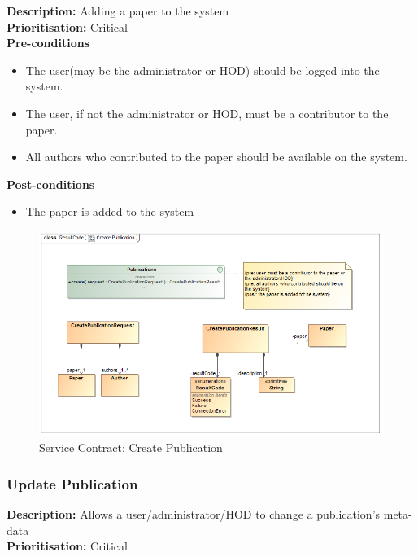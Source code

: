 \documentclass[a4paper]{article}
\begin{document}
        \textbf{Description:} Adding a paper to the system\\
        \textbf{Prioritisation:} Critical\\
        
        
        \textbf{Pre-conditions}
         \begin{itemize}
            \item The user(may be the administrator or HOD) should be logged into the system.
            \item The user, if not the administrator or HOD, must be a contributor to the paper.
            \item All authors who contributed to the paper should be available on the system.
       \end{itemize}
        
        \textbf{Post-conditions}
        \begin{itemize}
            \item The paper is added to the system
        \end{itemize}
        
            	\begin{figure}[H]
            		\centering
            		\includegraphics[width=\textwidth]{../Assignment1/5.1.5.Create.Publication.Services.Contract.png}
            		\caption{Service Contract: Create Publication}
            	\end{figure}
        \pagebreak
    \subsubsection{Update Publication}
        
        \textbf{Description:} Allows a user/administrator/HOD to change a publication's meta-data\\
        \textbf{Prioritisation:} Critical\\
        \\
        
\end{document}
